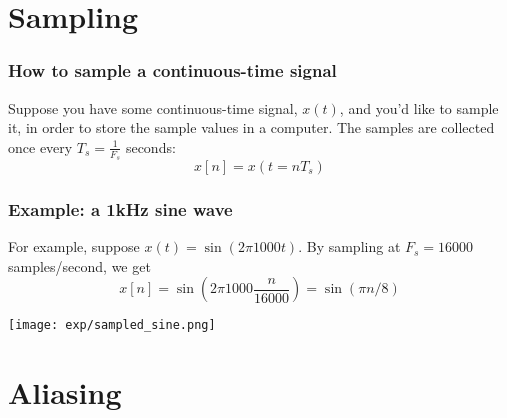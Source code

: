 \documentclass{beamer}
\begin{document}
\section[Sampling]{Sampling}
\setcounter{subsection}{1}

\begin{frame}
  \frametitle{How to sample a continuous-time signal}

  Suppose you have some continuous-time signal, $x(t)$, and you'd like
  to sample it, in order to store the sample values in a computer.
  The samples are collected once every $T_s=\frac{1}{F_s}$ seconds:
  \begin{displaymath}
    x[n] = x(t=nT_s)
  \end{displaymath}
\end{frame}

\begin{frame}
  \frametitle{Example: a 1kHz sine wave}

  For example, suppose $x(t)=\sin(2\pi 1000t)$.  By sampling at
  $F_s=16000$ samples/second, we get
  \begin{displaymath}
    x[n] = \sin\left(2\pi 1000\frac{n}{16000}\right) = \sin(\pi n/8)
  \end{displaymath}
  
  \centerline{\texttt{[image: exp/sampled\_sine.png]}}
\end{frame}

\section[Aliasing]{Aliasing}
\setcounter{subsection}{1}
\end{document}

